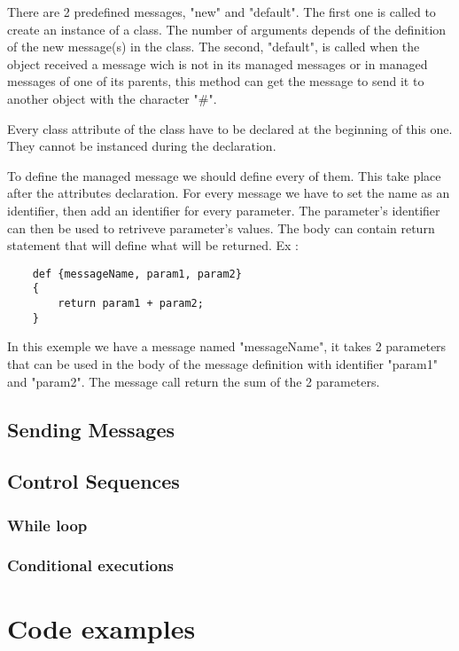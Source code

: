 \documentclass{eplDoc}
\begin{document}
There are 2 predefined messages, "new" and "default".  The first one is called 
to create an instance of a class.  The number of arguments depends of the 
definition of the new message(s) in the class.  The second, "default", is called
when the object received a message wich is not in its managed messages or in 
managed messages of one of its parents, this method can get the message to send 
it to another object with the character "\#". 


Every class attribute of the class have to be declared at the beginning of this one.  
They cannot be instanced during the declaration.

To define the managed message we should define every of them.  This take place after the attributes declaration.  For every message we have to set the name as an identifier, then add an identifier for every parameter. The parameter's identifier can then be used to retriveve parameter's values. 
The body can contain return statement that will define what will be returned.
Ex : 
\begin{lstlisting}
    def {messageName, param1, param2}
    {
        return param1 + param2;
    }
\end{lstlisting}
In this exemple we have a message named "messageName", it takes 2 parameters that can be used in the body of the message definition with identifier "param1" and "param2".  The message call return the sum of the 2 parameters.


\subsection{Sending Messages}

\subsection{Control Sequences} %

\subsubsection{While loop}

\subsubsection{Conditional executions}

\section{Code examples}
\end{document}
